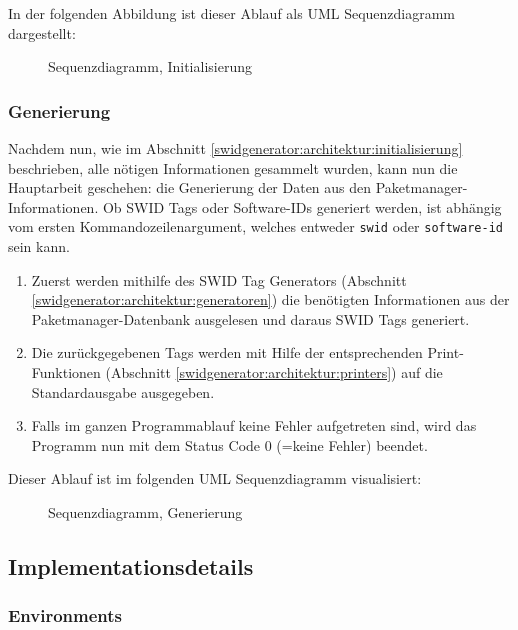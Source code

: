 In der folgenden Abbildung ist dieser Ablauf als UML Sequenzdiagramm
dargestellt:

\begin{figure}[H]
	\centering
	
	\caption{Sequenzdiagramm, Initialisierung}
\end{figure}

\subsubsection{Generierung}
\label{swidgenerator:architektur:generierung}

Nachdem nun, wie im Abschnitt \ref{swidgenerator:architektur:initialisierung}
beschrieben, alle nötigen Informationen gesammelt wurden, kann nun die
Hauptarbeit geschehen: die Generierung der Daten aus den
Paketmanager-Informationen. Ob SWID Tags oder Software-IDs generiert werden, ist
abhängig vom ersten Kommandozeilenargument, welches entweder \texttt{swid} oder
\texttt{software-id} sein kann.

\begin{enumerate}
	\item Zuerst werden mithilfe des SWID Tag Generators (Abschnitt
	\ref{swidgenerator:architektur:generatoren}) die benötigten Informationen aus
	der Paketmanager-Datenbank ausgelesen und daraus SWID Tags generiert.
		
	\item Die zurückgegebenen Tags werden mit Hilfe der entsprechenden
	Print-Funktionen (Abschnitt \ref{swidgenerator:architektur:printers}) auf die
	Standardausgabe ausgegeben.
		
	\item Falls im ganzen Programmablauf keine Fehler aufgetreten sind, wird das
	Programm nun mit dem Status Code 0 (=keine Fehler) beendet.
\end{enumerate}

Dieser Ablauf ist im folgenden UML Sequenzdiagramm visualisiert:

\begin{figure}[H]
	\centering
	
	\caption{Sequenzdiagramm, Generierung}
\end{figure}


\subsection{Implementationsdetails}

\subsubsection{Environments}
\label{swidgenerator:architektur:environments}

